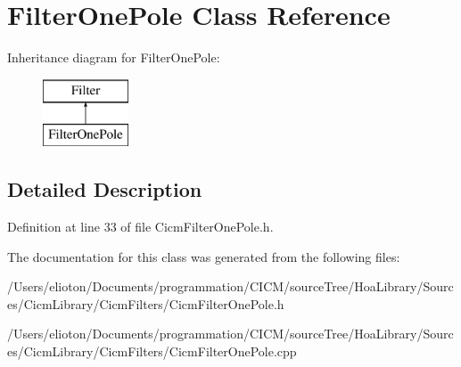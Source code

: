 \hypertarget{class_filter_one_pole}{\section{Filter\-One\-Pole Class Reference}
\label{class_filter_one_pole}
}
Inheritance diagram for Filter\-One\-Pole\-:\begin{figure}[H]
\begin{center}
\leavevmode
\includegraphics[height=2.000000cm]{class_filter_one_pole}
\end{center}
\end{figure}


\subsection{Detailed Description}


Definition at line 33 of file Cicm\-Filter\-One\-Pole.\-h.



The documentation for this class was generated from the following files\-:\begin{DoxyCompactItemize}
\item 
/\-Users/elioton/\-Documents/programmation/\-C\-I\-C\-M/source\-Tree/\-Hoa\-Library/\-Sources/\-Cicm\-Library/\-Cicm\-Filters/Cicm\-Filter\-One\-Pole.\-h\item 
/\-Users/elioton/\-Documents/programmation/\-C\-I\-C\-M/source\-Tree/\-Hoa\-Library/\-Sources/\-Cicm\-Library/\-Cicm\-Filters/Cicm\-Filter\-One\-Pole.\-cpp\end{DoxyCompactItemize}
